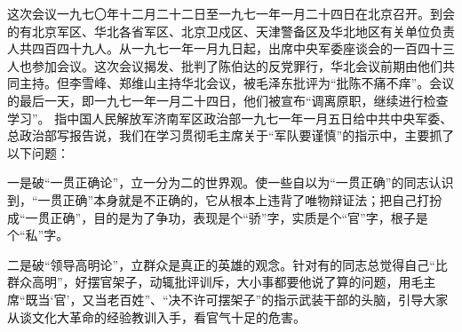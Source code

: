 \begin{maonote}
这次会议一九七〇年十二月二十二日至一九七一年一月二十四日在北京召开。到会的有北京军区、华北各省军区、北京卫戍区、天津警备区及华北地区有关单位负责人共四百四十九人。从一九七一年一月九日起，出席中央军委座谈会的一百四十三人也参加会议。这次会议揭发、批判了陈伯达的反党罪行，华北会议前期由他们共同主持。但李雪峰、郑维山主持华北会议，被毛泽东批评为“批陈不痛不痒”。会议的最后一天，即一九七一年一月二十四日，他们被宣布“调离原职，继续进行检查学习”。
指中国人民解放军济南军区政治部一九七一年一月五日给中共中央军委、总政治部写报告说，我们在学习贯彻毛主席关于“军队要谨慎”的指示中，主要抓了以下问题：

一是破“一贯正确论”，立一分为二的世界观。使一些自以为“一贯正确”的同志认识到，“一贯正确”本身就是不正确的，它从根本上违背了唯物辩证法；把自己打扮成“一贯正确”，目的是为了争功，表现是个“骄”字，实质是个“官”字，根子是个“私”字。

二是破“领导高明论”，立群众是真正的英雄的观念。针对有的同志总觉得自己“比群众高明”，好摆官架子，动辄批评训斥，大小事都要他说了算的问题，用毛主席“既当‘官’，又当老百姓”、“决不许可摆架子”的指示武装干部的头脑，引导大家从谈文化大革命的经验教训入手，看官气十足的危害。


\end{maonote}
